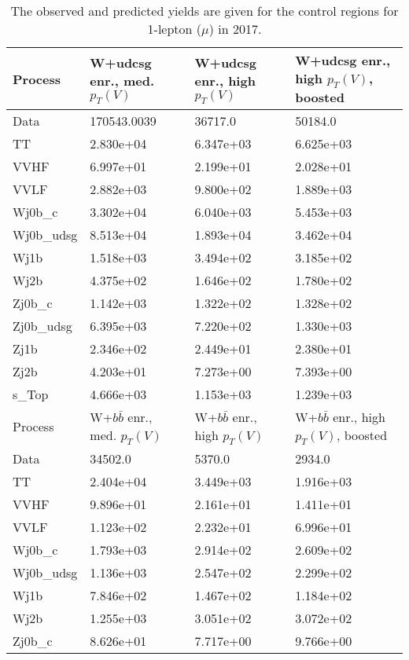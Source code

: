\begin{table}
\centering
\caption[2017 1-lepton ($\mu$) control region yields]{
                  The observed and predicted yields are given for the
                  control regions for 1-lepton ($\mu$) in 2017.
                  }
{\footnotesize
\begin{tabularx}{0.8\textwidth}{|X|X|X|X|}
\hline
Process & W+udcsg enr., med. $p_{T}(V)$ & W+udcsg enr., high $p_{T}(V)$ & W+udcsg enr., high $p_{T}(V)$, boosted \\
\hline
Data & 170543.0039 & 36717.0 & 50184.0 \\
\hline
TT & 2.830e+04 & 6.347e+03 & 6.625e+03 \\
VVHF & 6.997e+01 & 2.199e+01 & 2.028e+01 \\
VVLF & 2.882e+03 & 9.800e+02 & 1.889e+03 \\
Wj0b\_c & 3.302e+04 & 6.040e+03 & 5.453e+03 \\
Wj0b\_udsg & 8.513e+04 & 1.893e+04 & 3.462e+04 \\
Wj1b & 1.518e+03 & 3.494e+02 & 3.185e+02 \\
Wj2b & 4.375e+02 & 1.646e+02 & 1.780e+02 \\
Zj0b\_c & 1.142e+03 & 1.322e+02 & 1.328e+02 \\
Zj0b\_udsg & 6.395e+03 & 7.220e+02 & 1.330e+03 \\
Zj1b & 2.346e+02 & 2.449e+01 & 2.380e+01 \\
Zj2b & 4.203e+01 & 7.273e+00 & 7.393e+00 \\
s\_Top & 4.666e+03 & 1.153e+03 & 1.239e+03 \\
\hline
\hline
Process & W+$b\bar{b}$ enr., med. $p_{T}(V)$ & W+$b\bar{b}$ enr., high $p_{T}(V)$ & W+$b\bar{b}$ enr., high $p_{T}(V)$, boosted \\
\hline
Data & 34502.0 & 5370.0 & 2934.0 \\
\hline
TT & 2.404e+04 & 3.449e+03 & 1.916e+03 \\
VVHF & 9.896e+01 & 2.161e+01 & 1.411e+01 \\
VVLF & 1.123e+02 & 2.232e+01 & 6.996e+01 \\
Wj0b\_c & 1.793e+03 & 2.914e+02 & 2.609e+02 \\
Wj0b\_udsg & 1.136e+03 & 2.547e+02 & 2.299e+02 \\
Wj1b & 7.846e+02 & 1.467e+02 & 1.184e+02 \\
Wj2b & 1.255e+03 & 3.051e+02 & 3.072e+02 \\
Zj0b\_c & 8.626e+01 & 7.717e+00 & 9.766e+00 \\

\end{tabularx}}
\end{table}
